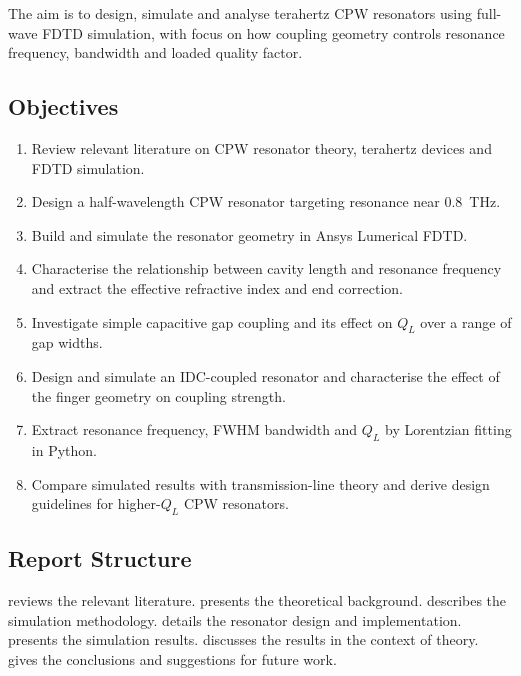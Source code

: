 \documentclass[12pt,a4paper]{article}
\begin{document}
The aim is to design, simulate and analyse terahertz CPW resonators
using full-wave FDTD simulation, with focus on how coupling geometry
controls resonance frequency, bandwidth and loaded quality factor.

\subsection{Objectives}

\begin{enumerate}[label=\textbf{O\arabic*:}]
    \item Review relevant literature on CPW resonator theory, terahertz
          devices and FDTD simulation.
    \item Design a half-wavelength CPW resonator targeting resonance near
          \SI{0.8}{\tera\hertz}.
    \item Build and simulate the resonator geometry in Ansys Lumerical FDTD.
    \item Characterise the relationship between cavity length and resonance
          frequency and extract the effective refractive index and end
          correction.
    \item Investigate simple capacitive gap coupling and its effect on
          $Q_L$ over a range of gap widths.
    \item Design and simulate an IDC-coupled resonator and characterise the
          effect of the finger geometry on coupling strength.
    \item Extract resonance frequency, FWHM bandwidth and $Q_L$ by
          Lorentzian fitting in Python.
    \item Compare simulated results with transmission-line theory and
          derive design guidelines for higher-$Q_L$ CPW resonators.
\end{enumerate}

\subsection{Report Structure}

 reviews the relevant literature.
 presents the theoretical background.
 describes the simulation methodology.
 details the resonator design and implementation.
 presents the simulation results.
 discusses the results in the context of theory.
 gives the conclusions and suggestions for future
work.
\end{document}
